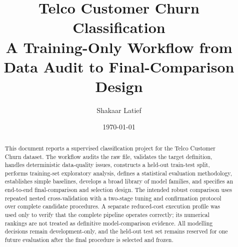 \documentclass[11pt,a4paper]{article}
\title{\textbf{Telco Customer Churn Classification}\\[0.25em]
\large A Training-Only Workflow from Data Audit to Final-Comparison Design}
\author{Shakaar Latief}
\date{\today}
\begin{document}
\maketitle

\begin{abstract}
This document reports a supervised classification project for the Telco Customer Churn dataset. The workflow audits the raw file, validates the target definition, handles deterministic data-quality issues, constructs a held-out train-test split, performs training-set exploratory analysis, defines a statistical evaluation methodology, establishes simple baselines, develops a broad library of model families, and specifies an end-to-end final-comparison and selection design. The intended robust comparison uses repeated nested cross-validation with a two-stage tuning and confirmation protocol over complete candidate procedures. A separate reduced-cost execution profile was used only to verify that the complete pipeline operates correctly; its numerical rankings are not treated as definitive model-comparison evidence. All modelling decisions remain development-only, and the held-out test set remains reserved for one future evaluation after the final procedure is selected and frozen.
\end{abstract}

\newpage
\tableofcontents
\newpage



\newpage


\newpage


\newpage


\newpage


\newpage


\newpage


\newpage


\newpage


\newpage


\newpage


\newpage


\newpage

\end{document}
